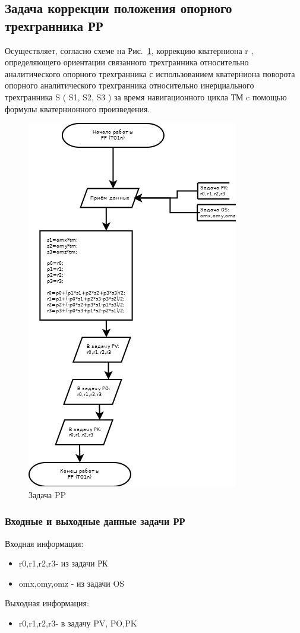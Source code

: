 \subsection{Задача коррекции положения опорного трехгранника РР}
Осуществляет, согласно схеме на Рис.~\ref{fig:PP}, коррекцию  кватерниона r ,  определяющего ориентации связанного трехгранника относительно  
аналитического опорного трехгранника с использованием  кватерниона  поворота опорного аналитического трехгранника   относительно   
инерциального трехгранника  S  (  S1,  S2,  S3 ) за время навигационного  цикла  ТМ c  помощью  формулы кватернионного произведения.
\begin{figure}[H]
    \centering
    \includegraphics[width=0.75\linewidth]{images/PP.png}
    \caption{Задача PP}
    \label{fig:PP}
\end{figure}
\subsubsection{Входные и выходные данные задачи РР}
Входная информация:
\begin{itemize}
 \item r0,r1,r2,r3- из задачи  РК
 \item omx,omy,omz - из задачи  OS
\end{itemize}
Выходная информация:
\begin{itemize}
\item r0,r1,r2,r3- в задачу PV, PO,PK
\end{itemize}
